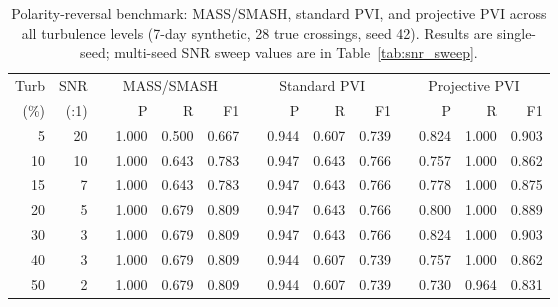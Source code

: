 \documentclass[12pt,letterpaper]{article}
\begin{document}
\begin{table}[htbp]
\centering
\small
\caption{Polarity-reversal benchmark: MASS/SMASH, standard PVI, and projective
  PVI across all turbulence levels (7-day synthetic, 28 true crossings, seed 42).
  Results are single-seed; multi-seed SNR sweep values are in
  Table~\ref{tab:snr_sweep}.}
\label{tab:projpvi_polarity}
\setlength{\tabcolsep}{5pt}
\begin{tabular}{rr lrrr lrrr lrrr}
\toprule
Turb & SNR &
  \multicolumn{4}{c}{MASS/SMASH} &
  \multicolumn{4}{c}{Standard PVI} &
  \multicolumn{4}{c}{Projective PVI} \\
\cmidrule(lr){3-6}\cmidrule(lr){7-10}\cmidrule(lr){11-14}
(\%) & (:1) & & P & R & F1 & & P & R & F1 & & P & R & F1 \\
\midrule
 5 & 20 & & 1.000 & 0.500 & 0.667 & & 0.944 & 0.607 & 0.739 & & 0.824 & 1.000 & 0.903 \\
10 & 10 & & 1.000 & 0.643 & 0.783 & & 0.947 & 0.643 & 0.766 & & 0.757 & 1.000 & 0.862 \\
15 &  7 & & 1.000 & 0.643 & 0.783 & & 0.947 & 0.643 & 0.766 & & 0.778 & 1.000 & 0.875 \\
20 &  5 & & 1.000 & 0.679 & 0.809 & & 0.947 & 0.643 & 0.766 & & 0.800 & 1.000 & 0.889 \\
30 &  3 & & 1.000 & 0.679 & 0.809 & & 0.947 & 0.643 & 0.766 & & 0.824 & 1.000 & 0.903 \\
40 &  3 & & 1.000 & 0.679 & 0.809 & & 0.944 & 0.607 & 0.739 & & 0.757 & 1.000 & 0.862 \\
50 &  2 & & 1.000 & 0.679 & 0.809 & & 0.944 & 0.607 & 0.739 & & 0.730 & 0.964 & 0.831 \\
\bottomrule
\end{tabular}
\end{table}
\end{document}
